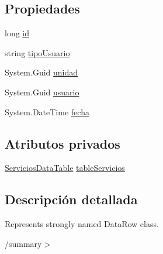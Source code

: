 \subsection*{Propiedades}
\begin{DoxyCompactItemize}
\item 
long \hyperlink{class_proyecto___integrador__3_1_1ds_servicios_1_1_servicios_row_a639945a9ac10b4caf0f453134dd2fbf3}{id}
\item 
string \hyperlink{class_proyecto___integrador__3_1_1ds_servicios_1_1_servicios_row_abdee6fc7289aefefff6388effd42f27c}{tipo\-Usuario}
\item 
System.\-Guid \hyperlink{class_proyecto___integrador__3_1_1ds_servicios_1_1_servicios_row_a1eeaaa0bc7a97bcb431c5ae850268498}{unidad}
\item 
System.\-Guid \hyperlink{class_proyecto___integrador__3_1_1ds_servicios_1_1_servicios_row_a258338e08401da8418ebd0d6dede8ad2}{usuario}
\item 
System.\-Date\-Time \hyperlink{class_proyecto___integrador__3_1_1ds_servicios_1_1_servicios_row_a555547658fa71e0e540c35adc66bb450}{fecha}
\end{DoxyCompactItemize}
\subsection*{Atributos privados}
\begin{DoxyCompactItemize}
\item 
\hyperlink{class_proyecto___integrador__3_1_1ds_servicios_1_1_servicios_data_table}{Servicios\-Data\-Table} \hyperlink{class_proyecto___integrador__3_1_1ds_servicios_1_1_servicios_row_a85bb3c370c1c6a424e314e851191631d}{table\-Servicios}
\end{DoxyCompactItemize}


\subsection{Descripción detallada}
Represents strongly named Data\-Row class. 

/summary$>$ 


